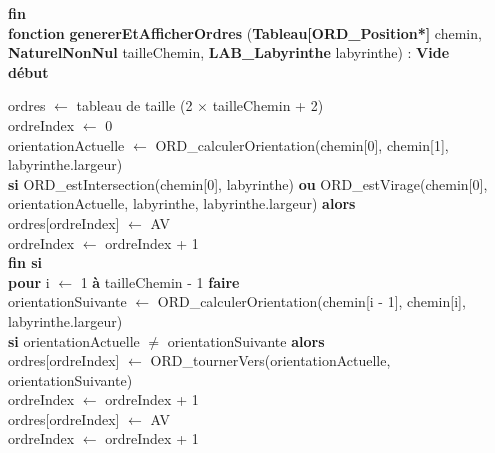 \documentclass[a4paper, 11pt]{article}
\begin{document}
\textbf{fin}\\

\noindent\textbf{fonction} \textbf{genererEtAfficherOrdres} (\textbf{Tableau[ORD\_Position*]} chemin, \textbf{NaturelNonNul} tailleChemin, \textbf{LAB\_Labyrinthe} labyrinthe) : \textbf{Vide}\\
\textbf{début}
\begin{flushleft}
    \hspace*{1cm}ordres $\gets$ tableau de taille (2 $\times$ tailleChemin + 2)\\
    \hspace*{1cm}ordreIndex $\gets$ 0\\
    \hspace*{1cm}orientationActuelle $\gets$ ORD\_calculerOrientation(chemin[0], chemin[1], labyrinthe.largeur)\\
    \hspace*{1cm}\textbf{si} ORD\_estIntersection(chemin[0], labyrinthe) \textbf{ou} ORD\_estVirage(chemin[0], orientationActuelle, labyrinthe, labyrinthe.largeur) \textbf{alors}\\
    \hspace*{2cm}ordres[ordreIndex] $\gets$ AV\\
    \hspace*{2cm}ordreIndex $\gets$ ordreIndex + 1\\
    \hspace*{1cm}\textbf{fin si}\\
    \hspace*{1cm}\textbf{pour} i $\gets$ 1 \textbf{à} tailleChemin - 1 \textbf{faire}\\
    \hspace*{2cm}orientationSuivante $\gets$ ORD\_calculerOrientation(chemin[i - 1], chemin[i], labyrinthe.largeur)\\
    \hspace*{2cm}\textbf{si} orientationActuelle $\neq$ orientationSuivante \textbf{alors}\\
    \hspace*{3cm}ordres[ordreIndex] $\gets$ ORD\_tournerVers(orientationActuelle, orientationSuivante)\\
    \hspace*{3cm}ordreIndex $\gets$ ordreIndex + 1\\
    \hspace*{3cm}ordres[ordreIndex] $\gets$ AV\\
    \hspace*{3cm}ordreIndex $\gets$ ordreIndex + 1\\

\end{flushleft}
\end{document}
